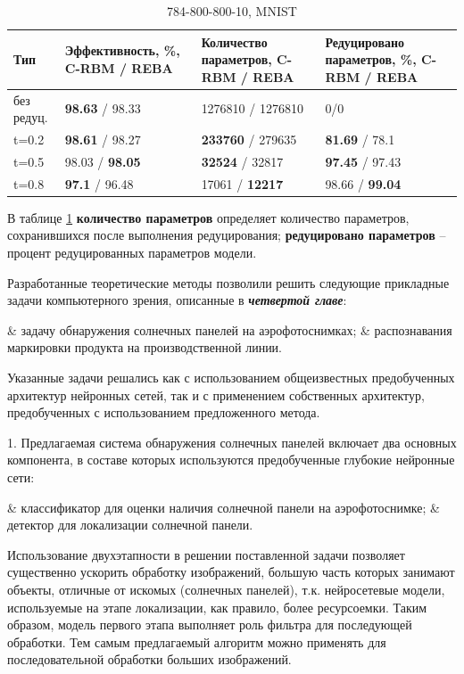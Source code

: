 \documentclass{thesisby}
\begin{document}
\begin{table} [h!]
  \small
  \caption{784-800-800-10, MNIST}\label{table:results_mnist_reduce}
\centering
\begin{tabular}{| p{2cm} | p{4cm} | p{4cm} | p{4cm} |}
  \hline
    \textbf{Тип} & \textbf{Эффективность, \%, C-RBM / REBA} & \textbf{Количество параметров, C-RBM / REBA} & \textbf{Редуцировано параметров, \%, C-RBM / REBA}\\
    \hline
    без редуц. & \textbf{98.63} / 98.33 & 1276810 / 1276810 & 0/0\\
    \hline
    t=0.2 & \textbf{98.61} / 98.27 & \textbf{233760} / 279635 & \textbf{81.69} / 78.1\\
    \hline
    t=0.5 & 98.03 / \textbf{98.05} & \textbf{32524} / 32817 & \textbf{97.45} / 97.43\\
    \hline
    t=0.8 & \textbf{97.1} / 96.48 & 17061 / \textbf{12217} & 98.66 / \textbf{99.04}\\
    \hline
\end{tabular}
\end{table}

В таблице \ref{table:results_mnist_reduce} \textbf{количество параметров} определяет количество параметров, сохранившихся после выполнения редуцирования; \textbf{редуцировано параметров} -- процент редуцированных параметров модели.

Разработанные теоретические методы позволили решить следующие прикладные задачи компьютерного зрения, описанные в \textit{\textbf{четвертой главе}}:
\begin{easylistNum}
    & задачу обнаружения солнечных панелей на аэрофотоснимках;
    & распознавания маркировки продукта на производственной линии.
\end{easylistNum}
Указанные задачи решались как с использованием общеизвестных предобученных архитектур нейронных сетей, так и с применением собственных архитектур, предобученных с использованием предложенного метода.

1. Предлагаемая система обнаружения солнечных панелей включает два основных компонента, в составе которых используются предобученные глубокие нейронные сети: 

\begin{easylistNum}
    & классификатор для оценки наличия солнечной панели на аэрофотоснимке;
    & детектор для локализации солнечной панели.
\end{easylistNum}

Использование двухэтапности в решении поставленной задачи позволяет существенно ускорить обработку изображений, большую часть которых занимают объекты, отличные от искомых (солнечных панелей), т.к. нейросетевые модели, используемые на этапе локализации, как правило, более ресурсоемки. Таким образом, модель первого этапа выполняет роль фильтра для последующей обработки. Тем самым предлагаемый алгоритм можно применять для последовательной обработки больших изображений.
\end{document}

